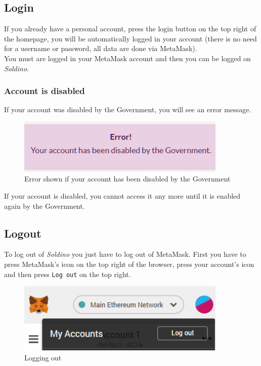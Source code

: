 	\subsection{Login}
	If you already have a personal account, press the login button on the 
	top right of the homepage, you will be automatically logged in your account 
	(there is no need for a username or password, all data are done via MetaMask). 
	\\You must are logged in your MetaMask\glo{} account and then you can be logged on \textit{Soldino}.
		\subsubsection{Account is disabled}
		If your account was disabled by the Government, you will see an error 
		message.
		\begin{figure}[H]
			\includegraphics[width=10cm]{res/images/user_disabled.png}
			\centering
			\caption{Error shown if your account has been disabled by the Government}
		\end{figure}
	\noindent If your account is disabled, you cannot access it any more until it 
	is enabled again by the Government.
	\subsection{Logout}
	To log out of \textit{Soldino} you just have to log out of 
	MetaMask\glo{}. First you have to press MetaMask's icon on the top 
	right of the browser, press your account's icon and then press \texttt{Log out}
	on the top right.
	\begin{figure}[H]
		\includegraphics[width=10cm]{res/images/logout_metamask.png}
		\centering
		\caption{Logging out}
	\end{figure}
